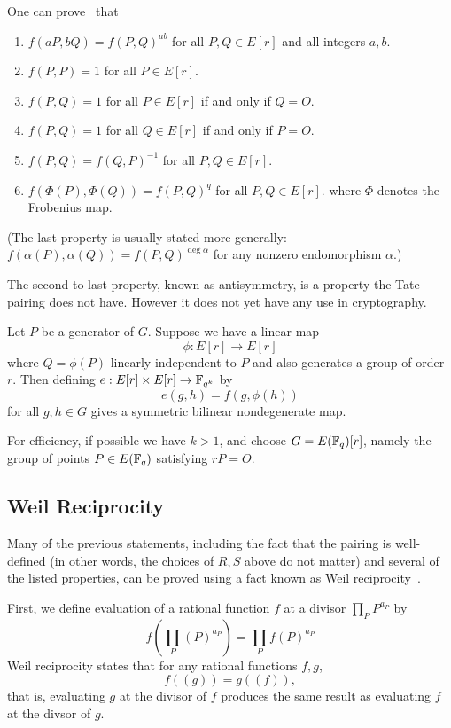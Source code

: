 One can prove~\cite{silverman} that
\begin{enumerate}
\item
$f(a P, b Q) = f(P,Q)^{a b}$ for all $P, Q \in E[r]$ and all integers $a, b$.
\item
$f(P,P) = 1$ for all $P \in E[r]$.
\item
$f(P,Q) = 1$ for all $P \in E[r]$ if and only if $Q = O$.
\item
$f(P,Q) = 1$ for all $Q \in E[r]$ if and only if $P = O$.
\item
$f(P,Q) = f(Q,P)^{-1}$ for all $P,Q \in E[r]$.
\item
$f(\Phi(P),\Phi(Q)) = f(P,Q)^{q}$ for all $P,Q \in E[r]$.
where $\Phi$ denotes the Frobenius map.
\end{enumerate}

(The last property is usually stated more generally:
$f(\alpha(P),\alpha(Q)) = f(P,Q)^{\deg \alpha}$ for any nonzero
endomorphism $\alpha$.)

The second to last property, known as antisymmetry, is a property the
Tate pairing does not have. However it does not yet have
any use in cryptography.

Let $P$ be a generator of $G$. Suppose
we have a linear map
\[ \phi : E[r] \rightarrow E[r] \]
where $Q = \phi(P)$ linearly independent to $P$ and also generates
a group of order $r$.
Then defining $e:E[r]\times E[r]\rightarrow \mathbb{F}_{q^k}$ by
\[ e(g,h) = f(g,\phi(h)) \]
for all $g, h \in G$
gives a symmetric bilinear nondegenerate map.

For efficiency, if possible we have $k > 1$, and choose
$G = E(\mathbb{F}_q)[r]$, namely the
group of points $P \in E(\mathbb{F}_q)$ satisfying $r P = O$.

\subsection {Weil Reciprocity}

Many of the previous statements, including the fact that the
pairing is well-defined (in other words, the choices of $R,S$ above
do not matter) and several of the listed properties, can be proved using
a fact known as Weil reciprocity~\cite{bf}.

First, we define evaluation of a rational function $f$
at a divisor $\prod_P P^{a_P}$  by
\[ f( \prod_P (P)^{a_P} ) = \prod_P f(P)^{a_P} \]
Weil reciprocity states that
for any rational functions $f, g$,
\[f((g)) = g((f)) , \]
that is, evaluating $g$ at the divisor of $f$ produces the
same result as evaluating $f$ at the divsor of $g$.

